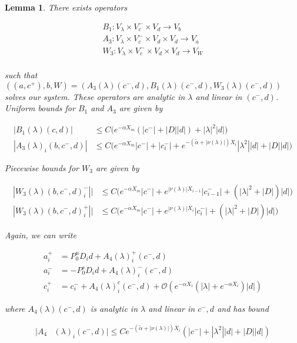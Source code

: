 \documentclass[12pt]{article}
\newtheorem{lemma}{Lemma}
\begin{document}
\begin{lemma}\label{inv3}
There exists operators

\begin{align*}
B_1: V_\lambda \times V_c^- \times V_d \rightarrow V_b \\
A_3: V_\lambda \times V_c^- \times V_d \times V_d \rightarrow V_a \\
W_3: V_\lambda \times V_c^- \times V_d \times V_d \rightarrow V_W \\
\end{align*}

such that $( (a, c^+) , b, W) = ( A_3(\lambda)(c^-,d), B_1(\lambda)(c^-, d), W_3(\lambda)(c^-,d) )$ solves our system. These operators are analytic in $\lambda$ and linear in $(c^-,d)$. Uniform bounds for $B_1$ and $A_3$ are given by

\begin{align}
|B_1(\lambda)(c, d)| &\leq C \Big( e^{-\alpha X_m}( |c^-| + |D||d|) + |\lambda|^2 |d| \Big) \\
|A_3(\lambda)_i(b, c^-, d)| &\leq C \Big( e^{-\alpha X_m} |c^-| + |c_i^-| + e^{-(\tilde{\alpha}+|\nu(\lambda)|) X_i} |\lambda^2| |d| + |D||d| \Big)
\end{align} 

Piecewise bounds for $W_3$ are given by

\begin{align}
|W_3(\lambda)(b,c^-,d)_i^-|| &\leq C \Big( e^{-\alpha X_m} |c^-| + e^{|\nu(\lambda)|X_{i-1}}|c_{i-1}^-| + (|\lambda|^2 + |D|)|d| \Big) \\
|W_3(\lambda)(b,c^-,d)_i^+|| 
&\leq C \Big( e^{-\alpha X_m} |c^-| + e^{|\nu(\lambda)|X_i}|c_i^-| + (|\lambda|^2 + |D|)|d| \Big)
\end{align}

Again, we can write

\begin{align*}
a_i^+ &= P^u_0 D_i d + A_4(\lambda)_i^+(c^-, d) \\
a_i^- &= -P^s_0 D_i d + A_4(\lambda)_i^-(c^-, d) \\
c_i^+ &= c_i^- + A_4(\lambda)_i^c(c^-, d) + \mathcal{O}( e^{-\alpha X_i} \left( |\lambda| +  e^{-\alpha X_i}  \right) |d| )
\end{align*}

where $A_4(\lambda)(c^-, d)$ is analytic in $\lambda$ and linear in $c^-, d$ and has bound

\begin{align}
|A_4&(\lambda)_i(c^-, d)| \leq C e^{-(\tilde{\alpha} + |\nu(\lambda)|)X_i} ( |c^-| + |\lambda^2| |d| + |D||d| )
\end{align}


\end{lemma}
\end{document}
